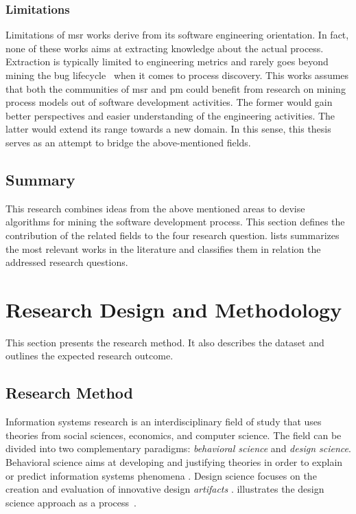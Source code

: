\documentclass[a4paper,11pt]{article}
\begin{document}
\subsubsection{Limitations}

Limitations of \gls{msr} works derive from its software engineering orientation. In fact, none of these works aims at extracting knowledge about the actual process. Extraction is typically limited to engineering metrics and rarely goes beyond mining the bug lifecycle~\cite{Poncin2011a} when it comes to process discovery. 
This works assumes that both the communities of \gls{msr} and \gls{pm} could benefit from research on mining process models out of software development activities. The former would gain better perspectives and easier understanding of the engineering activities. The latter would extend its range towards a new domain. In this sense, this thesis serves as an attempt to bridge the above-mentioned fields.

\subsection{Summary}

This research combines ideas from the above mentioned areas to devise algorithms for mining the software development process. This section defines the contribution of the related fields to the four research question.  lists summarizes the most relevant works in the literature and classifies them in relation the addressed research questions.




\section{Research Design and Methodology}
\label{sec:methods}

This section presents the research method. It also describes the dataset and outlines the expected research outcome.

\subsection{Research Method}

Information systems research is an interdisciplinary field of study that uses theories from social sciences, economics, and computer science. The field can be divided into two complementary paradigms: \emph{behavioral science} and \emph{design science}. Behavioral science aims at developing and justifying theories in order to explain or predict information systems phenomena \cite{Gregor2006}. Design science focuses on the creation and evaluation of innovative design \emph{artifacts} \cite{Hevner2004}.  illustrates the design science approach as a process~\cite{Peffers2008}. 
\end{document}
